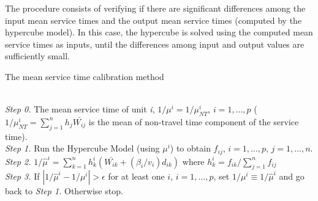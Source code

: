 The procedure consists
of verifying if there are significant differences
among the input mean service times
and the output mean service times (computed by the hypercube model). 
In this case, 
the hypercube
is solved using the computed mean service times as inputs, 
until the differences among input and output values
are sufficiently small.

\begin{center}
  The mean service time calibration method
\end{center}
\vspace{-8pt}
\hline \\
\vspace{2pt}
\textit{Step 0.} The mean service time of unit \textit{i},
$1/\mu^{i}=1/\mu_{NT}^{i}$, $i = 1,\ldots,p$ 
($1/\mu_{NT}^{i} = \sum_{j=1}^{n}{h_j\bar{W_{ij}}}$ 
is the mean of non-travel time component of the service time). \\
\textit{Step 1.} Run the Hypercube Model (using $\mu^i$) to obtain
$f_{ij}$, $i = 1,\ldots,p$, $j = 1,\ldots,n$. \\
\textit{Step 2.} $1/\hat{\mu}^{i} =
\sum_{k=1}^{n}{
  h_{k}^{i}(\bar{W_{ik}}+(\beta_{i}/v_{i})d_{ik})
}$ 
where 
$h_{k}^{i} = f_{ik}/\sum_{j=1}^{n}{f_{ij}}$ \\
\textit{Step 3.} If $|1/\hat{\mu}^{i}-1/\mu^{i}|>\epsilon$
for at least one $i$, $i=1,\ldots,p$,
set $1/\mu^{i} \equiv 1/\hat{\mu}^{i}$
and go back to \textit{Step 1.}
Otherwise stop. \\
\hline


